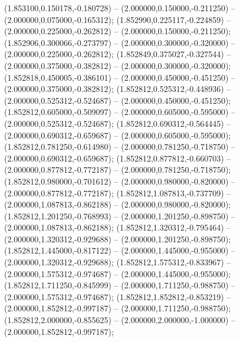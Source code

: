 (1.853100,0.150178,-0.180728) -- (2.000000,0.150000,-0.211250) -- (2.000000,0.075000,-0.165312);
 (1.852990,0.225117,-0.224859) -- (2.000000,0.225000,-0.262812) -- (2.000000,0.150000,-0.211250);
 (1.852906,0.300066,-0.273797) -- (2.000000,0.300000,-0.320000) -- (2.000000,0.225000,-0.262812);
 (1.852849,0.375027,-0.327544) -- (2.000000,0.375000,-0.382812) -- (2.000000,0.300000,-0.320000);
 (1.852818,0.450005,-0.386101) -- (2.000000,0.450000,-0.451250) -- (2.000000,0.375000,-0.382812);
 (1.852812,0.525312,-0.448936) -- (2.000000,0.525312,-0.524687) -- (2.000000,0.450000,-0.451250);
 (1.852812,0.605000,-0.509097) -- (2.000000,0.605000,-0.595000) -- (2.000000,0.525312,-0.524687);
 (1.852812,0.690312,-0.564445) -- (2.000000,0.690312,-0.659687) -- (2.000000,0.605000,-0.595000);
 (1.852812,0.781250,-0.614980) -- (2.000000,0.781250,-0.718750) -- (2.000000,0.690312,-0.659687);
 (1.852812,0.877812,-0.660703) -- (2.000000,0.877812,-0.772187) -- (2.000000,0.781250,-0.718750);
 (1.852812,0.980000,-0.701612) -- (2.000000,0.980000,-0.820000) -- (2.000000,0.877812,-0.772187);
 (1.852812,1.087813,-0.737709) -- (2.000000,1.087813,-0.862188) -- (2.000000,0.980000,-0.820000);
 (1.852812,1.201250,-0.768993) -- (2.000000,1.201250,-0.898750) -- (2.000000,1.087813,-0.862188);
 (1.852812,1.320312,-0.795464) -- (2.000000,1.320312,-0.929688) -- (2.000000,1.201250,-0.898750);
 (1.852812,1.445000,-0.817122) -- (2.000000,1.445000,-0.955000) -- (2.000000,1.320312,-0.929688);
 (1.852812,1.575312,-0.833967) -- (2.000000,1.575312,-0.974687) -- (2.000000,1.445000,-0.955000);
 (1.852812,1.711250,-0.845999) -- (2.000000,1.711250,-0.988750) -- (2.000000,1.575312,-0.974687);
 (1.852812,1.852812,-0.853219) -- (2.000000,1.852812,-0.997187) -- (2.000000,1.711250,-0.988750);
 (1.852812,2.000000,-0.855625) -- (2.000000,2.000000,-1.000000) -- (2.000000,1.852812,-0.997187);
